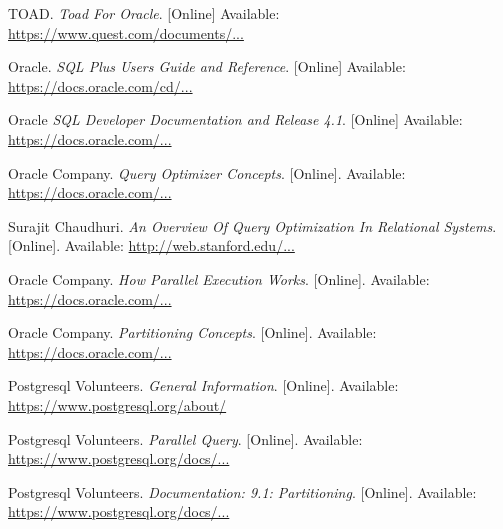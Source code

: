 \documentclass[draftclsnofoot, onecolumn, compsoc, 10pt]{IEEEtran}
\begin{document}

\begin{thebibliography}{9}
TOAD.
\textit{Toad For Oracle}.
[Online]
Available: \href{https://www.quest.com/documents/toad-for-oracle-datasheet-67887.pdf}{https://www.quest.com/documents/...}

Oracle.
\textit{SQL Plus Users Guide and Reference}.
[Online]
Available: \href{https://docs.oracle.com/cd/B19306_01/server.102/b14357/qstart.htm#i1056581}{https://docs.oracle.com/cd/...}

Oracle
\textit{SQL Developer Documentation and Release 4.1}.
[Online]
Available: \href{https://docs.oracle.com/cd/E55747_01/index.htm}{https://docs.oracle.com/...}

Oracle Company.
\textit{Query Optimizer Concepts}.
[Online].
Available: \href{https://docs.oracle.com/database/121/TGSQL/tgsql_optcncpt.htm#TGSQL192}{https://docs.oracle.com/...}
 
Surajit Chaudhuri.
\textit{An Overview Of Query Optimization In Relational Systems}.
[Online].
Available: \href{http://web.stanford.edu/class/cs345d-01/rl/chaudhuri98.pdf}{http://web.stanford.edu/...}

Oracle Company.
\textit{How Parallel Execution Works}.
[Online].
Available: \href{https://docs.oracle.com/cd/E11882_01/server.112/e25523/parallel002.htm}{https://docs.oracle.com/...}

Oracle Company.
\textit{Partitioning Concepts}.
[Online].
Available: \href{https://docs.oracle.com/cd/B28359_01/server.111/b32024/partition.htm}{https://docs.oracle.com/...}

Postgresql Volunteers.
\textit{General Information}.
[Online].
Available: \href{https://www.postgresql.org/about/}{https://www.postgresql.org/about/}

Postgresql Volunteers.
\textit{Parallel Query}.
[Online].
Available: \href{https://www.postgresql.org/docs/current/static/parallel-query.html}{https://www.postgresql.org/docs/...}

Postgresql Volunteers.
\textit{Documentation: 9.1: Partitioning}.
[Online].
Available: \href{https://www.postgresql.org/docs/9.1/static/ddl-partitioning.html}{https://www.postgresql.org/docs/...}


\end{thebibliography}
\end{document}
